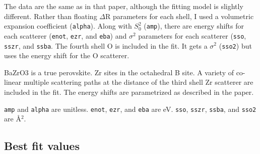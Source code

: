 \documentclass[11pt]{article}
\begin{document}
The data are the same as in that paper, although the fitting model is
slightly different. Rather than floating $\Delta$R parameters for each
shell, I used a volumetric expansion coefficient
(\texttt{alpha}). Along with $S_0^2$ (\texttt{amp}), there are energy
shifts for each scatterer (\texttt{enot}, \texttt{ezr}, and
\texttt{eba}) and $\sigma^2$ parameters for each scatterer
(\texttt{sso}, \texttt{sszr}, and \texttt{ssba}.  The fourth shell O
is included in the fit. It gets a $\sigma^2$ (\texttt{sso2}) but uses
the energy shift for the O scatterer.

BaZrO3 is a true perovskite. Zr sites in the octahedral B site. A
variety of co-linear multiple scattering paths at the distance of the
third shell Zr scatterer are included in the fit. The energy shifts are
parametrized as described in the paper.

\texttt{amp} and \texttt{alpha} are unitless. \texttt{enot}, \texttt{ezr}, and \texttt{eba} are eV. \texttt{sso},
\texttt{sszr}, \texttt{ssba}, and \texttt{sso2} are {\AA}$^2$.

\subsection{Best fit values}
\label{sec:orgheadline26}
\end{document}
